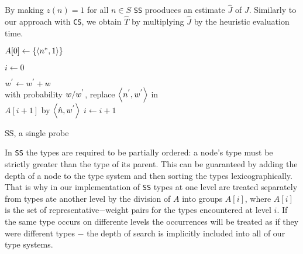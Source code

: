 By making $z(n) = 1$ for all $n \in S$ \texttt{SS} prooduces an estimate $\hat{J}$ of $J$. Similarly to our approach with \texttt{CS}, we obtain $\hat{T}$ by multiplying $\hat{J}$ by the heuristic evaluation time.


\begin{algorithm}

$A[0] \leftarrow \{\left\langle  n\sp{*},1 \right\rangle \}$

$i \leftarrow 0$

 {
	 {
		 {
			 {
				 {
				$w\sp{'} \leftarrow w\sp{'} + w$\\ 
				with probability $w/w\sp{'}$, replace $\left\langle n\sp{'}, w\sp{'} \right\rangle$ in\\ $A[i+1]$ by $\left\langle \hat{n},w\sp{'} \right\rangle$
				} 
			}
		}
	}
	$i \leftarrow i + 1$
}
\caption{SS, a single probe}
\label{alg:ss_algorithm}
\end{algorithm}

In \texttt{SS} the types are required to be partially ordered: a node's type must be strictly greater than the type of its parent. This can be guaranteed by adding the depth of a node to the type system and then sorting the types lexicographically. That is why in our implementation of \texttt{SS} types at one level are treated separately from types ate another level by the division of $A$ into groups $A[i]$, where $A[i]$ is the set of representative$-$weight pairs for the types encountered at level $i$. If the same type occurs on differente levels the occurrences will be treated as if they were different types $-$ the depth of search is implicitly included into all of our type systems.\\

